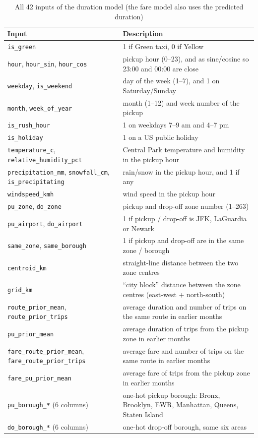 \documentclass[12pt,a4paper]{article}
\begin{document}
\begin{table}[!htbp]
\centering
\caption{All 42 inputs of the duration model (the fare model also uses the predicted duration)}
\label{tab:allfeatures}
\small
\begin{tabularx}{\textwidth}{l L}
\toprule
Input & Description \\
\midrule
\texttt{is\_green} & 1 if Green taxi, 0 if Yellow \\
\texttt{hour}, \texttt{hour\_sin}, \texttt{hour\_cos} & pickup hour (0--23), and as sine/cosine so 23:00 and 00:00 are close \\
\texttt{weekday}, \texttt{is\_weekend} & day of the week (1--7), and 1 on Saturday/Sunday \\
\texttt{month}, \texttt{week\_of\_year} & month (1--12) and week number of the pickup \\
\texttt{is\_rush\_hour} & 1 on weekdays 7--9 am and 4--7 pm \\
\texttt{is\_holiday} & 1 on a US public holiday \\
\texttt{temperature\_c}, \texttt{relative\_humidity\_pct} & Central Park temperature and humidity in the pickup hour \\
\texttt{precipitation\_mm}, \texttt{snowfall\_cm}, \texttt{is\_precipitating} & rain/snow in the pickup hour, and 1 if any \\
\texttt{windspeed\_kmh} & wind speed in the pickup hour \\
\texttt{pu\_zone}, \texttt{do\_zone} & pickup and drop-off zone number (1--263) \\
\texttt{pu\_airport}, \texttt{do\_airport} & 1 if pickup / drop-off is JFK, LaGuardia or Newark \\
\texttt{same\_zone}, \texttt{same\_borough} & 1 if pickup and drop-off are in the same zone / borough \\
\texttt{centroid\_km} & straight-line distance between the two zone centres \\
\texttt{grid\_km} & ``city block'' distance between the zone centres (east-west + north-south) \\
\texttt{route\_prior\_mean}, \texttt{route\_prior\_trips} & average duration and number of trips on the same route in earlier months \\
\texttt{pu\_prior\_mean} & average duration of trips from the pickup zone in earlier months \\
\texttt{fare\_route\_prior\_mean}, \texttt{fare\_route\_prior\_trips} & average fare and number of trips on the same route in earlier months \\
\texttt{fare\_pu\_prior\_mean} & average fare of trips from the pickup zone in earlier months \\
\texttt{pu\_borough\_*} (6 columns) & one-hot pickup borough: Bronx, Brooklyn, EWR, Manhattan, Queens, Staten Island \\
\texttt{do\_borough\_*} (6 columns) & one-hot drop-off borough, same six areas \\
\bottomrule
\end{tabularx}
\end{table}
\end{document}
